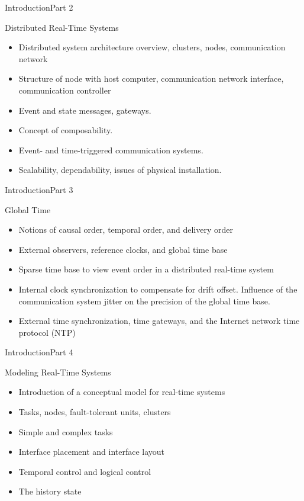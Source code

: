 \begin{frame}{Introduction}{Part 2}
    \begin{block}{Distributed Real-Time Systems}
\begin{itemize}
\item
  Distributed system architecture overview, clusters, nodes,
  communication network
\item
  Structure of node with host computer, communication network interface,
  communication controller
\item
  Event and state messages, gateways.
\item
  Concept of composability.
\item
  Event- and time-triggered communication systems.
\item
  Scalability, dependability, issues of physical installation.
\end{itemize}
\end{block}
\end{frame}


\begin{frame}{Introduction}{Part 3}
    \begin{block}{Global Time}
\begin{itemize}
\item
  Notions of causal order, temporal order, and delivery order
\item
  External observers, reference clocks, and global time base
\item
  Sparse time base to view event order in a distributed real-time system
\item
  Internal clock synchronization to compensate for drift offset.
  Influence of the communication system jitter on the precision of the
  global time base.
\item
  External time synchronization, time gateways, and the Internet network
  time protocol (NTP)
\end{itemize}
\end{block}
\end{frame}


\begin{frame}{Introduction}{Part 4}
    \begin{block}{Modeling Real-Time Systems}
\begin{itemize}
\item
  Introduction of a conceptual model for real-time systems
\item
  Tasks, nodes, fault-tolerant units, clusters
\item
  Simple and complex tasks
\item
  Interface placement and interface layout
\item
  Temporal control and logical control
\item
  The history state
\end{itemize}
\end{block}
\end{frame}


